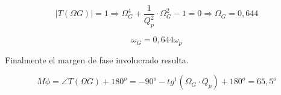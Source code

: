 \begin{equation}
    |T(\Omega G)| = 1 \Longrightarrow \Omega _G ^4 + \frac{1}{Q_p^2} \cdot \Omega_G^2 - 1 = 0 \Longrightarrow \Omega _G = 0,644
\end{equation}

\begin{equation}
    \omega _G = 0,644 \omega _p
\end{equation}


\bigskip
\hspace{1mm} Finalmente el margen de fase involucrado resulta.

\begin{equation}
    M \phi = \angle T(\Omega G) + 180 ^o = -90^o - tg^1 ( \Omega _G \cdot Q_p) + 180^o = 65,5^o 
\end{equation}
